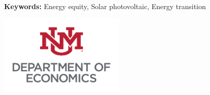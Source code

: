 \begin{titlepage}
\begin{center}
\begin{flushleft}
    \vspace{1em}
\textbf{Keywords:} Energy equity, Solar photovoltaic, Energy transition

\end{flushleft}
   \vspace{1em}

\includegraphics[width = 6cm]{figures/unm.png}






\end{center}

\end{titlepage}

